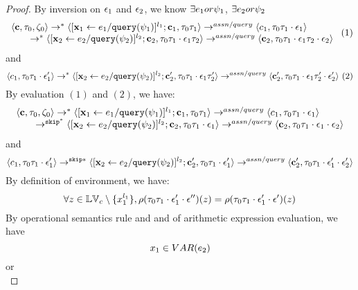 \begin{proof}
%
By inversion  on 
 $\mathtt{\epsilon}_1$ and $\mathtt{\epsilon}_2$, we know $\exists e_1 or \psi_1$, $\exists e_2 or \psi_2$
 \[
  \begin{array}{l}   
\langle {\boldsymbol{\mathbf{c}}}, \mathtt{\tau}_0, \mathtt{\zeta}_0 \rangle \rightarrow^{*} 
\langle [\mathrel{ {\boldsymbol{\mathbf{x}}}_1 \leftarrow e_1 / {\tt query}(\psi_1) }]^{l_1} ; {\boldsymbol{\mathbf{c}}}_1, \mathtt{\tau}_0 \mathtt{\tau}_1 \rangle  
\rightarrow^{assn/query}
 \langle c_1, \mathtt{\tau}_0 \mathtt{\tau}_1 \cdot \mathtt{\epsilon}_1 \rangle \\
  \qquad \rightarrow^{*} 
  \langle [\mathrel{ {\boldsymbol{\mathbf{x}}}_2 \leftarrow e_2 / {\tt query}(\psi_2) }]^{l_2};{\boldsymbol{\mathbf{c}}}_2, 
  \mathtt{\tau}_0 \mathtt{\tau}_1 \cdot \mathtt{\epsilon}_1 \mathtt{\tau}_2 \rangle 
  \rightarrow^{assn/query} 
  \langle {\boldsymbol{\mathbf{c}}}_2,  \mathtt{\tau}_0 \mathtt{\tau}_1 \cdot \mathtt{\epsilon}_1 \mathtt{\tau}_2 \cdot \mathtt{\epsilon}_2 \rangle 
\end{array} ~ (1)
 \]
 and 
  \[
  \langle c_1, \mathtt{\tau}_0 \mathtt{\tau}_1 \cdot \mathtt{\epsilon}_1' \rangle 
  \rightarrow^{*} 
  \langle [\mathrel{ {\boldsymbol{\mathbf{x}}}_2 \leftarrow e_2 / {\tt query}(\psi_2) }]^{l_2} ; {\boldsymbol{\mathbf{c}}}_2', \mathtt{\tau}_0 \mathtt{\tau}_1 \cdot \mathtt{\epsilon}_1 \mathtt{\tau}_2' \rangle 
  \rightarrow^{assn/query} 
  \langle {\boldsymbol{\mathbf{c}}}_2',  \mathtt{\tau}_0 \mathtt{\tau}_1 \cdot \mathtt{\epsilon}_1 \mathtt{\tau}_2' \cdot \mathtt{\epsilon}_2' \rangle 
 ~(2)
 \]
%
 By evaluation $(1)$ and $(2)$, we have:
\[
  \begin{array}{l}   
\langle {\boldsymbol{\mathbf{c}}}, \mathtt{\tau}_0, \mathtt{\zeta}_0 \rangle \rightarrow^{*} 
\langle [\mathrel{ {\boldsymbol{\mathbf{x}}}_1 \leftarrow e_1 / {\tt query}(\psi_1) }]^{l_1} ; {\boldsymbol{\mathbf{c}}}_1, \mathtt{\tau}_0 \mathtt{\tau}_1 \rangle  \rightarrow^{assn/query}
 \langle c_1, \mathtt{\tau}_0 \mathtt{\tau}_1 \cdot \mathtt{\epsilon}_1 \rangle \\
  \qquad \rightarrow^{\mathtt{skip}^*} 
  \langle [\mathrel{ {\boldsymbol{\mathbf{x}}}_2 \leftarrow e_2 / {\tt query}(\psi_2) }]^{l_2};{\boldsymbol{\mathbf{c}}}_2, 
  \mathtt{\tau}_0 \mathtt{\tau}_1 \cdot \mathtt{\epsilon}_1 \rangle 
  \rightarrow^{assn/query} 
  \langle {\boldsymbol{\mathbf{c}}}_2,  \mathtt{\tau}_0 \mathtt{\tau}_1 \cdot \mathtt{\epsilon}_1 \cdot \mathtt{\epsilon}_2 \rangle 
\end{array}
 \]
 and 
  \[
  \langle c_1, \mathtt{\tau}_0 \mathtt{\tau}_1 \cdot \mathtt{\epsilon}_1' \rangle 
  \rightarrow^{\mathtt{skip}*} 
  \langle [\mathrel{ {\boldsymbol{\mathbf{x}}}_2 \leftarrow e_2 / {\tt query}(\psi_2) }]^{l_2} ; {\boldsymbol{\mathbf{c}}}_2', \mathtt{\tau}_0 \mathtt{\tau}_1 \cdot \mathtt{\epsilon}_1' \rangle 
  \rightarrow^{assn/query} 
  \langle {\boldsymbol{\mathbf{c}}}_2',  \mathtt{\tau}_0 \mathtt{\tau}_1 \cdot \mathtt{\epsilon}_1' \cdot \mathtt{\epsilon}_2' \rangle 
 \]
%
By definition of environment, we have:
\[
  \forall z \in \mathbb{LV}_c \setminus \{x_1^{l_1}\} ,
  \rho(\mathtt{\tau}_0 \mathtt{\tau}_1 \cdot \mathtt{\epsilon}_1' \cdot \mathtt{\epsilon}'') (z) =  
  \rho(\mathtt{\tau}_0 \mathtt{\tau}_1 \cdot \mathtt{\epsilon}_1' \cdot \mathtt{\epsilon}') (z)
\]
%
By operational semantics rule  and  and  of arithmetic expression evaluation, we have 
\[
  x_1 \in VAR(e_2)
\]
or
\[
\]
\end{proof}
